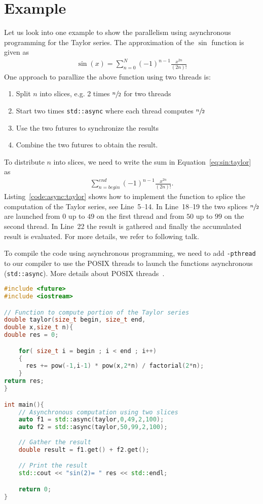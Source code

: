 \section*{Example}
Let us look into one example to show the parallelism using asynchronous programming for the Taylor series. The approximation of the $\sin$ function is given as
\begin{align}
\sin(x) = \sum\limits_{n=0}^N (-1)^{n-1} \frac{x^{2n}}{(2n)!} 
\label{eq:sin:taylor}
\end{align}
One approach to parallize the above function using two threads is:
\begin{enumerate}
\item Split $n$ into slices, e.g. 2 times $\sfrac{n}{2}$ for two threads
\item Start two times \lstinline|std::async| where each thread computes $\sfrac{n}{2}$
\item Use the two futures to synchronize the results
\item Combine the two futures to obtain the result.
\end{enumerate}
To distribute $n$ into slices, we need to write the sum in Equation~\eqref{eq:sin:taylor} as
\begin{align}
\sum\limits_{n=begin}^{end} (-1)^{n-1} \frac{x^{2n}}{(2n)!} \text{.}
\end{align}
Listing~\ref{code:async:taylor} shows how to implement the function to splice the computation of the Taylor series, see Line~5--14. In Line~18--19 the two splices $\sfrac{n}{2}$ are launched from $0$ up to $49$ on the first thread and from $50$ up to $99$ on the second thread. In Line~22 the result is gathered and finally the accumulated result is evaluated. For more details, we refer to following talk.

To compile the code using asynchronous programming, we need to add \lstinline|-pthread| to our compiler to use the POSIX threads to launch the functions asynchronous (\lstinline|std::async|). More details about POSIX threads~\cite{butenhof1997programming,kleiman1996programming}.




\begin{lstlisting}[language=c++,caption={Asynchronous computation of the $\sin$ function using a Taylor series.\label{code:async:taylor}},float,floatplacement=tb]
#include <future>
#include <iostream>

// Function to compute portion of the Taylor series
double taylor(size_t begin, size_t end, 
double x,size_t n){
double res = 0;

	for( size_t i = begin ; i < end ; i++)
	{
	  res += pow(-1,i-1) * pow(x,2*n) / factorial(2*n);
	} 
return res;
}

int main(){
	// Asynchronous computation using two slices
	auto f1 = std::async(taylor,0,49,2,100); 
	auto f2 = std::async(taylor,50,99,2,100); 
	
	// Gather the result
	double result = f1.get() + f2.get();

	// Print the result
	std::cout << "sin(2)= " res << std::endl;

	return 0;
}
\end{lstlisting}


